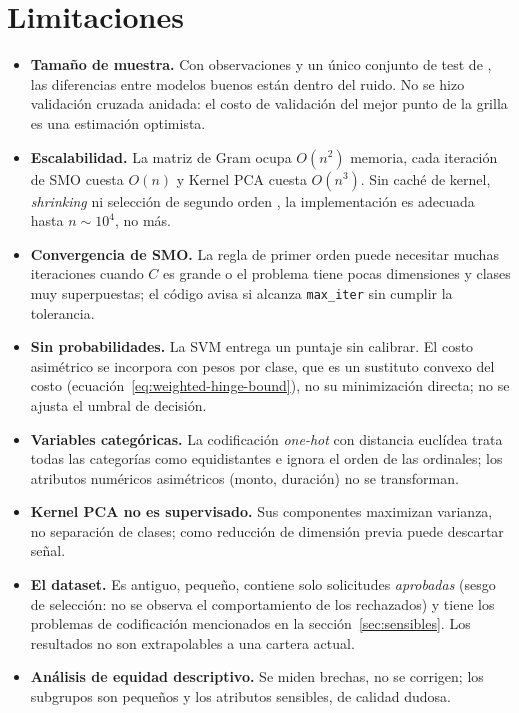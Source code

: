 \documentclass[11pt,a4paper]{article}
\newcommand{\code}[1]{\texttt{#1}}
\theoremstyle{plain}
\theoremstyle{definition}
\theoremstyle{remark}
\numberwithin{equation}{section}
\begin{document}
\FloatBarrier
\section{Limitaciones}\label{sec:limitaciones}

\begin{itemize}
  \item \textbf{Tamaño de muestra.} Con \ResNSamples{} observaciones y un único conjunto de
        test de \ResNTest{}, las diferencias entre modelos buenos están dentro del ruido. No
        se hizo validación cruzada anidada: el costo de validación del mejor punto de la
        grilla es una estimación optimista.
  \item \textbf{Escalabilidad.} La matriz de Gram ocupa $O(n^2)$ memoria, cada iteración de
        SMO cuesta $O(n)$ y Kernel PCA cuesta $O(n^3)$. Sin caché de kernel, \emph{shrinking}
        ni selección de segundo orden \cite{fan2005}, la implementación es adecuada hasta
        $n\sim10^4$, no más.
  \item \textbf{Convergencia de SMO.} La regla de primer orden puede necesitar muchas
        iteraciones cuando $C$ es grande o el problema tiene pocas dimensiones y clases muy
        superpuestas; el código avisa si alcanza \code{max\_iter} sin cumplir la tolerancia.
  \item \textbf{Sin probabilidades.} La SVM entrega un puntaje sin calibrar. El costo
        asimétrico se incorpora con pesos por clase, que es un sustituto convexo del costo
        (ecuación~\eqref{eq:weighted-hinge-bound}), no su minimización directa; no se ajusta
        el umbral de decisión.
  \item \textbf{Variables categóricas.} La codificación \emph{one-hot} con distancia
        euclídea trata todas las categorías como equidistantes e ignora el orden de las
        ordinales; los atributos numéricos asimétricos (monto, duración) no se transforman.
  \item \textbf{Kernel PCA no es supervisado.} Sus componentes maximizan varianza, no
        separación de clases; como reducción de dimensión previa puede descartar señal.
  \item \textbf{El dataset.} Es antiguo, pequeño, contiene solo solicitudes \emph{aprobadas}
        (sesgo de selección: no se observa el comportamiento de los rechazados) y tiene los
        problemas de codificación mencionados en la sección~\ref{sec:sensibles}. Los
        resultados no son extrapolables a una cartera actual.
  \item \textbf{Análisis de equidad descriptivo.} Se miden brechas, no se corrigen; los
        subgrupos son pequeños y los atributos sensibles, de calidad dudosa.
\end{itemize}
\end{document}
